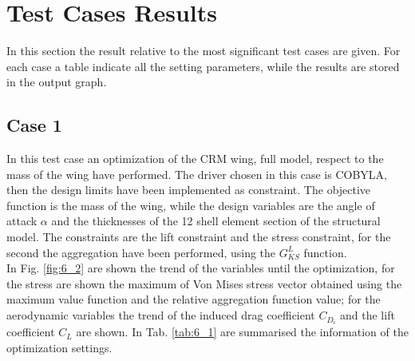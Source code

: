\section{Test Cases Results}
In this section the result relative to the most significant test cases are given. For each case a table indicate all the setting parameters, while the results are stored in the output graph.
\subsection{Case 1}
In this test case an optimization of the CRM wing, full model, respect to the mass of the wing have performed. The driver chosen in this case is COBYLA, then the design limits have been implemented as constraint. The objective function is the mass of the wing, while the design variables are the angle of attack $\alpha$ and the thicknesses of the 12 shell element section of the structural model. The constraints are the lift constraint and the stress constraint, for the second the aggregation have been performed, using the $G_{KS}^L$ function. \\
In Fig. \ref{fig:6_2} are shown the trend of the variables until the optimization, for the stress are shown the maximum of Von Mises stress vector obtained using the maximum value function and the relative aggregation function value; for the aerodynamic variables the trend of the induced drag coefficient $C_{D_i}$ and the lift coefficient $C_L$ are shown. In Tab. \ref{tab:6_1} are summarised the information of the optimization settings.
